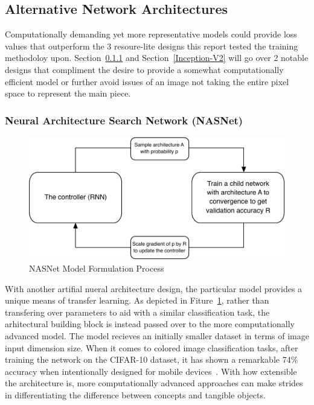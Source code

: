 \documentclass[conference]{IEEEtran}
\begin{document}

\subsection{Alternative Network Architectures}%

Computationally demanding yet more representative models could provide loss
values that outperform the 3 resoure-lite designs this report tested the
training methodoloy upon. Section~\ref{NasNet} and Section~\ref{Inception-V2}
will go over 2 notable designs that compliment the desire to provide a somewhat
computationally efficient model or further avoid issues of an image not taking
the entire pixel space to represent the main piece.


\subsubsection{Neural Architecture Search Network (NASNet)}\label{NasNet}


\begin{figure}[H]
  \centering
  \includegraphics[width=\linewidth]{figures/NAS-Diagram.pdf}
  \caption{NASNet Model Formulation Process~\cite{nasnet_paper}}%
  \label{fig:NasNet-Procss}
\end{figure}



With another artifial nueral architecture design, the particular model provides
a unique means of transfer learning. As depicted in
Fiture~\ref{fig:NasNet-Procss}, rather than transfering over parameters to
aid with a similar classification task, the arhitectural building block is
instead passed over to the more computationally advanced
model. The model recieves an initially smaller dataset in
terms of image input dimension size. When it comes to colored image
classification tasks, after training the network on the CIFAR-10 dataset, it has
shown a remarkable 74\% accuracy when intentionally designed for mobile
devices~\cite{nasnet_paper}.  With how extensible the architecture is, more
computationally advanced approaches can make strides in differentiating the
difference between concepts and tangible objects.
\end{document}
